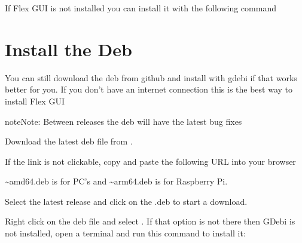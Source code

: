 \documentclass[letterpaper,10pt,english]{sphinxmanual}
\begin{document}
\sphinxAtStartPar
If Flex GUI is not installed you can install it with the following command

\begin{sphinxVerbatim}[commandchars=\\\{\}]
   
\end{sphinxVerbatim}


\section{Install the Deb}
\label{\detokenize{install:install-the-deb}}\label{\detokenize{install:install-deb}}
\sphinxAtStartPar
You can still download the deb from github and install with gdebi if that works
better for you. If you don’t have an internet connection this is the best way to
install Flex GUI

\begin{sphinxadmonition}{note}{Note:}
\sphinxAtStartPar
Between releases the deb will have the latest bug fixes
\end{sphinxadmonition}

\sphinxAtStartPar
{}

\sphinxAtStartPar
Download the latest deb file from
.

\sphinxAtStartPar
If the link is not clickable, copy and paste the following URL into your
browser

\begin{sphinxVerbatim}[commandchars=\\\{\}]
\end{sphinxVerbatim}

\sphinxAtStartPar
\textasciitilde{}amd64.deb is for PC’s and \textasciitilde{}arm64.deb is for Raspberry Pi.

\sphinxAtStartPar
Select the latest release and click on the .deb to start a download.

\sphinxAtStartPar
Right click on the deb file and select .
If that option is not there then GDebi is not installed, open a terminal and run
this command to install it:

\begin{sphinxVerbatim}[commandchars=\\\{\}]
   
\end{sphinxVerbatim}
\end{document}
